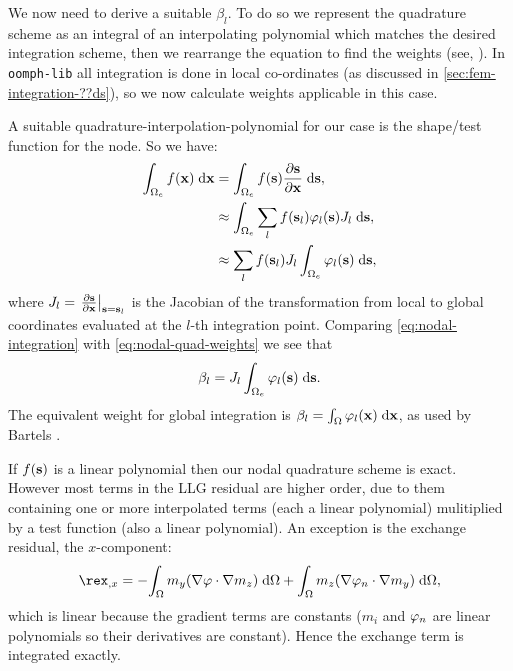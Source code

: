 
We now need to derive a suitable $\beta_l$.
To do so we represent the quadrature scheme as an integral of an interpolating polynomial which matches the desired integration scheme, then we rearrange the equation to find the weights (see, \eg \cite[480]{Kincaid2002}).
In \texttt{oomph-lib} all integration is done in local co-ordinates (as discussed in \autoref{sec:fem-integration-??ds}), so we now calculate weights applicable in this case.

A suitable quadrature-interpolation-polynomial for our case is the shape/test function for the node.
So we have:
\begin{equation}
  \label{eq:nodal-quad-weights}
  \begin{aligned}
    \int_{\Omega_e} f(\mathbf{x}) {\; \text{d}} \mathbf{x} &= \int_{\Omega_e} f({\mathbf{s}}) \frac{\partial {\mathbf{s}}}{\partial \mathbf{x}} {\; \text{d}} {\mathbf{s}}, \\
    &\approx \int_{\Omega_e} \sum_l f({\mathbf{s}}_l) \varphi_l({\mathbf{s}}) J_l {\; \text{d}} {\mathbf{s}}, \\
    &\approx  \sum_l f({\mathbf{s}}_l) J_l \int_{\Omega_e} \varphi_l({\mathbf{s}})  {\; \text{d}} {\mathbf{s}},
  \end{aligned} 
\end{equation}
where $J_l =  {\left. {\frac{\partial {\mathbf{s}}}{\partial \mathbf{x}}} \right|_{{\mathbf{s}}={\mathbf{s}}_l}}$ is the Jacobian of the transformation from local to global coordinates evaluated at the $l$-th integration point.
Comparing \eqref{eq:nodal-integration} with \eqref{eq:nodal-quad-weights} we see that
\begin{equation}
  \beta_l =  J_l \int_{\Omega_e} \varphi_l({\mathbf{s}})  {\; \text{d}} {\mathbf{s}}.
\end{equation}
The equivalent weight for global integration is $\beta_l = \int_{\Omega} \varphi_l(\mathbf{x}) {\; \text{d}} \mathbf{x}$, as used by Bartels \etal\cite{Bartels2006}.

If $f({\mathbf{s}})$ is a linear polynomial then our nodal quadrature scheme is exact.
However most terms in the LLG residual are higher order, due to them containing one or more interpolated terms (each a linear polynomial) mulitiplied by a test function (also a linear polynomial).
An exception is the exchange residual, \eg the $x$-component:
\begin{equation}
  \begin{aligned}
    \rex_{,x} = - \intd{ m_y \bigb{\grad \tbf \cdot \grad m_z}} + \intd{ m_z \bigb{\grad \tbf_n \cdot \grad m_y}},
  \end{aligned}
\end{equation}
which is linear because the gradient terms are constants ($m_i$ and $\varphi_n$ are linear polynomials so their derivatives are constant).
Hence the exchange term is integrated exactly.



